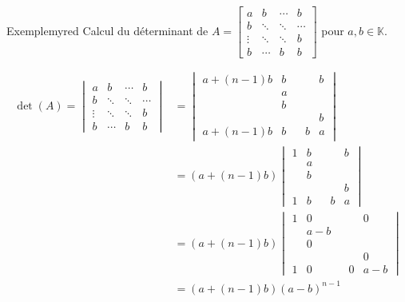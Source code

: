     \begin{omed}{Exemple}{myred}
        Calcul du déterminant de $A = \begin{bmatrix}
            a & b & \cdots & b \\
            b & \ddots & \ddots & \cdots \\
            \vdots & \ddots & \ddots & b \\
            b & \cdots & b & b
        \end{bmatrix}$ pour $a,b \in \mathbb{K}$.

        \begin{align*}
            \det(A) = \begin{vmatrix}
                a & b & \cdots & b \\
                b & \ddots & \ddots & \cdots \\
                \vdots & \ddots & \ddots & b \\
                b & \cdots & b & b
            \end{vmatrix} 
            &= \begin{vmatrix}
                a + (n-1)b & b & & & b \\
                 & a & & & \\
                 & b & & & \\
                 & & & & b \\
                 a + (n-1)b & b & & b & a 
            \end{vmatrix} \\
            &= (a + (n-1)b)  \begin{vmatrix}
                1 & b & & & b \\
                 & a & & & \\
                 & b & & & \\
                 & & & & b \\
                1 & b & & b & a 
            \end{vmatrix} \\
            &= (a + (n-1)b) \begin{vmatrix}
                1  & 0 & & & 0 \\
                 & a - b & & & \\
                 & 0 & & & \\
                 & & & & 0 \\
                1 & 0 & & 0 & a-b 
            \end{vmatrix}\\
            &= (a + (n-1)b)(a-b)^{n-1}
        \end{align*}
    \end{omed}

